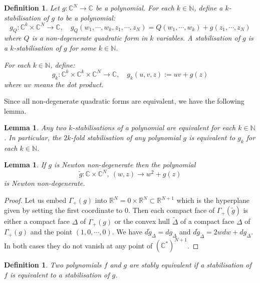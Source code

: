 \documentclass[11pt]{amsart}
\newtheorem{defn}[thm]{Definition}
\newtheorem{lemma}[thm]{Lemma}
\newcommand{\bR}{\mathbb{R}}
\newcommand{\bC}{\mathbb{C}}
\newcommand{\bN}{\mathbb{N}}
\numberwithin{equation}{section}
\newcommand{\C}{\mathbb C}
\begin{document}
\begin{defn} \label{defnstabilisation}
	Let $g : \bC^N \to \bC$ be a polynomial.
	For each $k \in \bN$, define a \emph{$k$-stabilisation} of $g$ to be a polynomial:
	\begin{equation}
		g_Q : \bC^k \times \bC^N \to \bC, \quad g_Q(w_1,\cdots, w_k,z_1,\cdots,z_N) = Q(w_1,\cdots,w_k) + g(z_1,\cdots,z_N)
	\end{equation}
	where $Q$ is a non-degenerate quadratic form in $k$ variables.
	A \emph{stabilisation} of $g$ is a $k$-stabilisation of $g$ for some $k \in \bN$.

	For each $k \in \bN$, define:
	\begin{equation}
		g_k : \bC^k \times \bC^k \times \bC^N \to \bC, \quad g_k(u,v,z) := uv + g(z)
	\end{equation}
	where $uv$ means the dot product.
\end{defn}

Since all non-degenerate quadratic forms are equivalent, we have the following lemma.
\begin{lemma} \label{equivalentstandard}
	Any two $k$-stabilisations of a polynomial are equivalent for each $k \in \bN$.
	In particular, the $2k$-fold stabilisation of any polynomial $g$ is equivalent to $g_k$ for each $k \in \bN$.
\end{lemma}

\begin{lemma} \label{lemmastabilisationofNND}
	If $g$ is Newton non-degenerate then the polynomial
	\begin{equation}
		\widetilde{g} : \bC \times \bC^N, \ (w,z) \to w^2 + g(z)
	\end{equation}
	is Newton non-degenerate.
\end{lemma}
\begin{proof}
	Let us embed $\Gamma_+(g)$ into $\bR^N = 0 \times \bR^N \subset \bR^{N+1}$ which is the hyperplane given by setting the first coordinate to $0$.
	Then each compact face of $\Gamma_+(\widetilde{g})$ is either a compact face $\Delta$ of $\Gamma_+(g)$ or the convex hull $\widetilde{\Delta}$ of a compact face $\Delta$ of $\Gamma_+(g)$ and the point $(1,0,\cdots,0)$.
	We have $d\widetilde{g}_\Delta = dg_\Delta$ and $d\widetilde{g}_{\widetilde{\Delta}} = 2wdw + dg_\Delta$. In both cases they do not vanish at any point of $(\C^*)^{N+1}$.
\end{proof}




\begin{defn} \label{defnstablyequivalent}
	Two polynomials $f$ and $g$ are \emph{stably equivalent} if a stabilisation of $f$ is equivalent to a stabilisation of $g$.
\end{defn}
\end{document}
